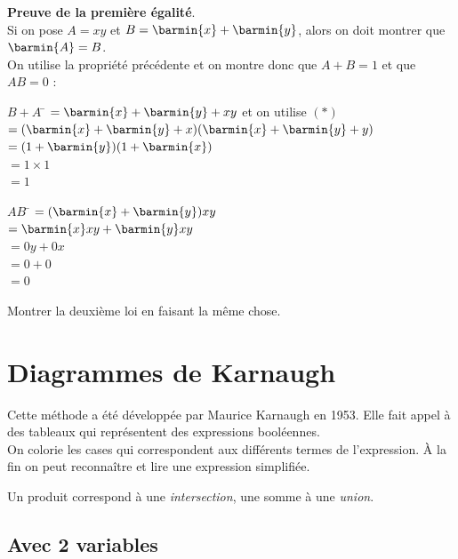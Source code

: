 \textbf{Preuve de la première égalité}.\\
Si on pose $A=xy$ et $B=\barmin{x}+\barmin{y}$, alors on doit montrer que $\barmin{A}=B$.\\
On utilise la propriété précédente et on montre donc que $A+B = 1$ et que $AB=0$ :
\begin{multicols}{2}

    \begin{tabbing}
        $B+A$ 	\=	$=\barmin{x}+\barmin{y}+xy$ et on utilise $(*)$\\[.5em]
        \>	$=(\barmin{x}+\barmin{y}+x)(\barmin{x}+\barmin{y}+y)$\\[.5em]
        \>  $=(1+\barmin{y})(1+\barmin{x})$\\[.5em]
        \>  $=1\times 1$\\[.5em]
        \> 	$=1$
    \end{tabbing}

    \begin{tabbing}
        $AB$ \=  $=(\barmin{x}+\barmin{y})xy$\\[.5em]
        \>  $=\barmin{x}xy+\barmin{y}xy$\\[.5em]
        \> 	$=0y+0x$\\[.5em]
        \> 	$=0+0$\\[.5em]
        \> 	$=0$
    \end{tabbing}
\end{multicols}
\begin{exercice}[]
    Montrer la deuxième loi en faisant la même chose.
\end{exercice}



\section{Diagrammes de Karnaugh}

Cette méthode a été développée par Maurice Karnaugh en 1953. Elle fait appel à des tableaux qui représentent des expressions booléennes.\\
On colorie les cases qui correspondent aux différents termes de l'expression. À la fin on peut reconnaître et lire une expression simplifiée.

\begin{propriete}[]
    Un produit correspond à une \textit{intersection}, une somme à une \textit{union}.
\end{propriete}

\subsection{Avec 2 variables}

